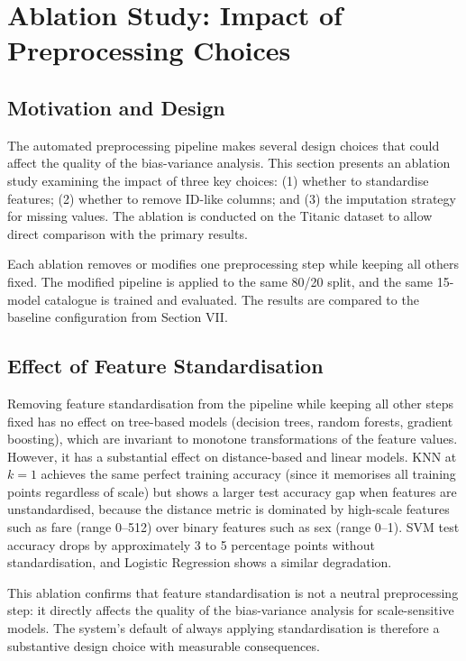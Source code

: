 \documentclass[conference]{IEEEtran}
\begin{document}
\section{Ablation Study: Impact of Preprocessing Choices}

\subsection{Motivation and Design}

The automated preprocessing pipeline makes several design choices that could affect the quality of the bias-variance analysis. This section presents an ablation study examining the impact of three key choices: (1) whether to standardise features; (2) whether to remove ID-like columns; and (3) the imputation strategy for missing values. The ablation is conducted on the Titanic dataset to allow direct comparison with the primary results.

Each ablation removes or modifies one preprocessing step while keeping all others fixed. The modified pipeline is applied to the same 80/20 split, and the same 15-model catalogue is trained and evaluated. The results are compared to the baseline configuration from Section VII.

\subsection{Effect of Feature Standardisation}

Removing feature standardisation from the pipeline while keeping all other steps fixed has no effect on tree-based models (decision trees, random forests, gradient boosting), which are invariant to monotone transformations of the feature values. However, it has a substantial effect on distance-based and linear models. KNN at $k=1$ achieves the same perfect training accuracy (since it memorises all training points regardless of scale) but shows a larger test accuracy gap when features are unstandardised, because the distance metric is dominated by high-scale features such as fare (range 0--512) over binary features such as sex (range 0--1). SVM test accuracy drops by approximately 3 to 5 percentage points without standardisation, and Logistic Regression shows a similar degradation.

This ablation confirms that feature standardisation is not a neutral preprocessing step: it directly affects the quality of the bias-variance analysis for scale-sensitive models. The system's default of always applying standardisation is therefore a substantive design choice with measurable consequences.
\end{document}
